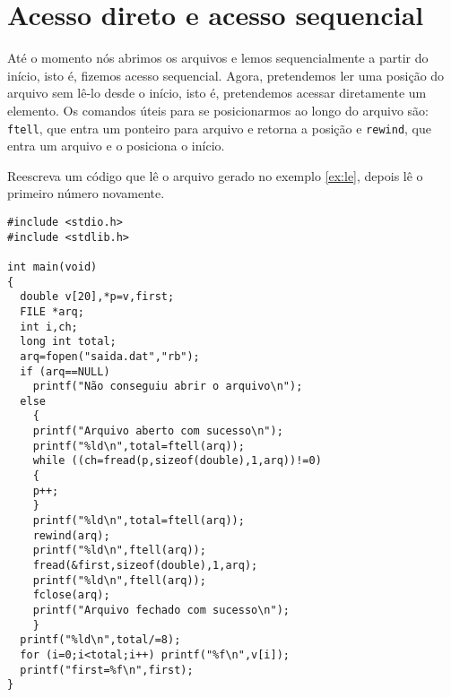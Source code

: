 \section{Acesso direto e acesso sequencial}
Até o momento nós abrimos os arquivos e lemos sequencialmente a partir do início, isto é, fizemos acesso sequencial. Agora, pretendemos ler uma posição do arquivo sem lê-lo desde o início, isto é, pretendemos acessar diretamente um elemento. Os comandos úteis para se posicionarmos ao longo do arquivo são: \verb|ftell|, que entra um ponteiro para arquivo e retorna a posição e \verb|rewind|, que entra um arquivo e o posiciona o início. 
\begin{ex}
Reescreva um código que lê o arquivo gerado no exemplo \ref{ex:le}, depois lê o primeiro número novamente.
\end{ex}
\begin{verbatim}
#include <stdio.h>
#include <stdlib.h>

int main(void)
{
  double v[20],*p=v,first;
  FILE *arq; 
  int i,ch;
  long int total;
  arq=fopen("saida.dat","rb");
  if (arq==NULL) 
    printf("Não conseguiu abrir o arquivo\n");
  else 
    {
    printf("Arquivo aberto com sucesso\n");  
    printf("%ld\n",total=ftell(arq));
    while ((ch=fread(p,sizeof(double),1,arq))!=0)
    {
    p++;
    }
    printf("%ld\n",total=ftell(arq));
    rewind(arq);
    printf("%ld\n",ftell(arq));
    fread(&first,sizeof(double),1,arq);
    printf("%ld\n",ftell(arq));
    fclose(arq);
    printf("Arquivo fechado com sucesso\n");
    }
  printf("%ld\n",total/=8);
  for (i=0;i<total;i++) printf("%f\n",v[i]);
  printf("first=%f\n",first);
}
\end{verbatim}

